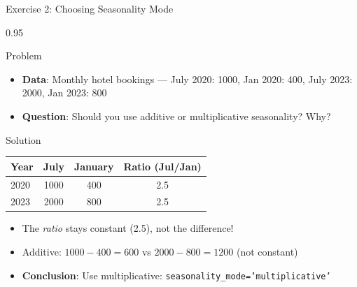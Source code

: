\documentclass[9pt, aspectratio=169, t]{beamer}
\begin{document}
\begin{frame}{Exercise 2: Choosing Seasonality Mode}
    \begin{cminipage}{0.95\textwidth}
    \begin{alertblock}{Problem}
        \begin{itemize}\setlength{\itemsep}{0pt}
            \item \textbf{Data}: Monthly hotel bookings --- July 2020: 1000, Jan 2020: 400, July 2023: 2000, Jan 2023: 800
            \item \textbf{Question}: Should you use additive or multiplicative seasonality? Why?
        \end{itemize}
    \end{alertblock}

    \vspace{0.2cm}
    \begin{exampleblock}{Solution}
        \begin{center}
        \small
        \begin{tabular}{lccc}
            \toprule
            Year & July & January & Ratio (Jul/Jan) \\
            \midrule
            2020 & 1000 & 400 & 2.5 \\
            2023 & 2000 & 800 & 2.5 \\
            \bottomrule
        \end{tabular}
        \end{center}
        \begin{itemize}\setlength{\itemsep}{0pt}
            \item The \textit{ratio} stays constant (2.5), not the difference!
            \item Additive: $1000 - 400 = 600$ vs $2000 - 800 = 1200$ (not constant)
            \item \textbf{Conclusion}: Use multiplicative: \texttt{seasonality\_mode='multiplicative'}
        \end{itemize}
    \end{exampleblock}
    \end{cminipage}
\end{frame}
\end{document}

